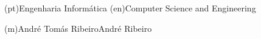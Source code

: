 \ntdegreename*(pt){Engenharia Informática}
\ntdegreename*(en){Computer Science and Engineering}





\ntauthorname(m){André Tomás Ribeiro}{André Ribeiro}

